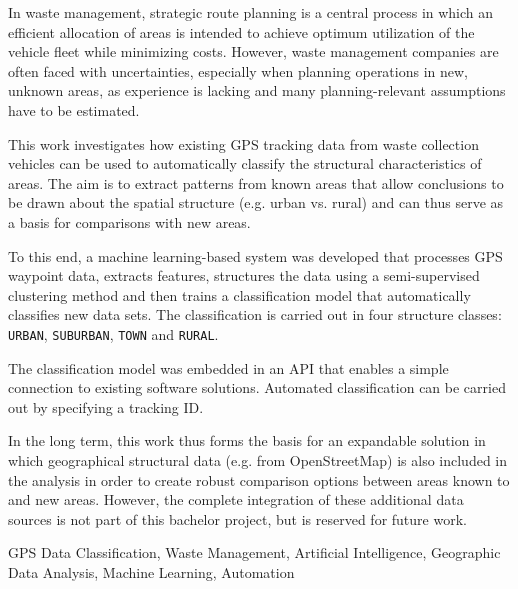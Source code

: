 \documentclass[a4paper,12pt,twoside]{scrreprt}
\begin{document}

In waste management, strategic route planning is a central
process in which an efficient allocation of areas is intended to achieve
optimum
utilization of the vehicle fleet while minimizing costs. However, waste
management companies are often faced with uncertainties, especially when
planning operations in new, unknown areas, as
experience is lacking and many planning-relevant assumptions have to be
estimated.

This work investigates how existing GPS tracking data from
waste collection vehicles can be used to automatically classify the structural
characteristics of
areas. The aim is to extract
patterns from known areas that allow conclusions to be drawn about the spatial
structure (e.g.
urban vs. rural) and can thus serve as a basis for comparisons with new
areas.

To this end, a machine learning-based system was developed that processes
GPS waypoint data, extracts features, structures the data using a
semi-supervised clustering method and then trains a
classification model that automatically classifies new data sets. The
classification is carried out in four structure classes: \texttt{URBAN},
\texttt{SUBURBAN}, \texttt{TOWN} and \texttt{RURAL}.

The classification model was embedded in an API that enables a simple
connection to existing software solutions. Automated classification can be
carried out by specifying a
tracking ID.

In the long term, this work thus forms the basis for an expandable
solution in which geographical structural data (e.g. from OpenStreetMap) is
also included in
the analysis in order to create robust comparison options between areas known
to
and new areas. However, the complete integration of these
additional data sources is not part of this bachelor project,
but is reserved for future work.
\vspace{0.5cm}

\noindent
GPS Data Classification, Waste Management, Artificial Intelligence, Geographic
Data Analysis, Machine Learning, Automation

\end{document}
